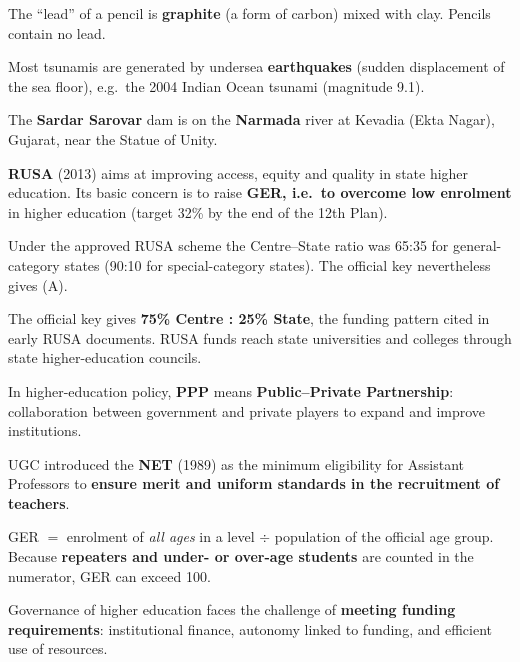 The ``lead'' of a pencil is \textbf{graphite} (a form of carbon) mixed with clay. Pencils contain no lead.

Most tsunamis are generated by undersea \textbf{earthquakes} (sudden displacement of the sea floor), e.g.\ the 2004 Indian Ocean tsunami (magnitude 9.1).

The \textbf{Sardar Sarovar} dam is on the \textbf{Narmada} river at Kevadia (Ekta Nagar), Gujarat, near the Statue of Unity.

\textbf{RUSA} (2013) aims at improving access, equity and quality in state higher education. Its basic concern is to raise \textbf{GER, i.e.\ to overcome low enrolment} in higher education (target 32\% by the end of the 12th Plan).

Under the approved RUSA scheme the Centre--State ratio was 65:35 for general-category states (90:10 for special-category states). The official key nevertheless gives (A).

The official key gives \textbf{75\% Centre : 25\% State}, the funding pattern cited in early RUSA documents. RUSA funds reach state universities and colleges through state higher-education councils.

In higher-education policy, \textbf{PPP} means \textbf{Public--Private Partnership}: collaboration between government and private players to expand and improve institutions.

UGC introduced the \textbf{NET} (1989) as the minimum eligibility for Assistant Professors to \textbf{ensure merit and uniform standards in the recruitment of teachers}.

GER $=$ enrolment of \emph{all ages} in a level $\div$ population of the official age group. Because \textbf{repeaters and under- or over-age students} are counted in the numerator, GER can exceed 100.

Governance of higher education faces the challenge of \textbf{meeting funding requirements}: institutional finance, autonomy linked to funding, and efficient use of resources.
